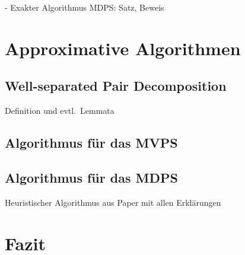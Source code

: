 \documentclass[11pt]{article}
\begin{document}
    - Exakter Algorithmus MDPS: Satz, Beweis


    \section{Approximative Algorithmen}
    \label{sec:approximative}

    \subsection{Well-separated Pair Decomposition}
    \label{subsec:wspd}

    Definition und evtl.\ Lemmata

    \subsection{Algorithmus für das MVPS}
    \label{subsec:mvps}
    
    \subsection{Algorithmus für das MDPS}
    \label{subsec:mdps}
    Heuristischer Algorithmus aus Paper mit allen Erklärungen

    \section{Fazit}
    \label{sec:fazit}

    
    
\end{document}
